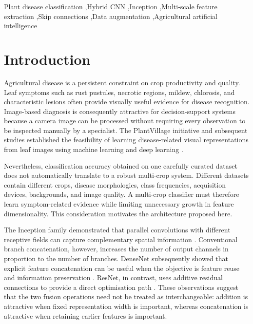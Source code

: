\documentclass[a4paper,fleqn]{cas-dc}
\begin{document}
\begin{keywords}
Plant disease classification \sep Hybrid CNN \sep Inception \sep Multi-scale feature extraction \sep Skip connections \sep Data augmentation \sep Agricultural artificial intelligence
\end{keywords}
\maketitle

\section{Introduction}
Agricultural disease is a persistent constraint on crop productivity and quality. Leaf symptoms such as rust pustules, necrotic regions, mildew, chlorosis, and characteristic lesions often provide visually useful evidence for disease recognition. Image-based diagnosis is consequently attractive for decision-support systems because a camera image can be processed without requiring every observation to be inspected manually by a specialist. The PlantVillage initiative and subsequent studies established the feasibility of learning disease-related visual representations from leaf images using machine learning and deep learning \citep{hughes2015,mohanty2016}.

Nevertheless, classification accuracy obtained on one carefully curated dataset does not automatically translate to a robust multi-crop system. Different datasets contain different crops, disease morphologies, class frequencies, acquisition devices, backgrounds, and image quality. A multi-crop classifier must therefore learn symptom-related evidence while limiting unnecessary growth in feature dimensionality. This consideration motivates the architecture proposed here.

The Inception family demonstrated that parallel convolutions with different receptive fields can capture complementary spatial information \citep{szegedy2015}. Conventional branch concatenation, however, increases the number of output channels in proportion to the number of branches. DenseNet subsequently showed that explicit feature concatenation can be useful when the objective is feature reuse and information preservation \citep{huang2017}. ResNet, in contrast, uses additive residual connections to provide a direct optimisation path \citep{he2016}. These observations suggest that the two fusion operations need not be treated as interchangeable: addition is attractive when fixed representation width is important, whereas concatenation is attractive when retaining earlier features is important.
\end{document}
